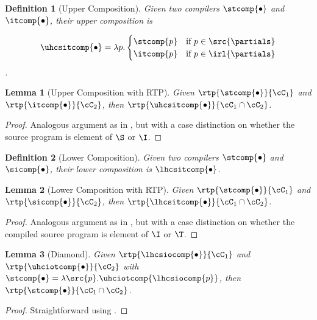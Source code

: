 \documentclass[a4paper,names,dvipsnames]{article}
\newtheorem{definition}{Definition}
\newtheorem{lemma}{Lemma}
\begin{document}
\begin{definition}[Upper Composition]
  Given two compilers $\stcomp{\bullet}$ and $\itcomp{\bullet}$, their upper composition is

  $$\uhcsitcomp{\bullet}=\lambda p.\begin{cases}\stcomp{p} &\text{if }p\in\src{\partials}\\
                                                \itcomp{p} &\text{if }p\in\irl{\partials}\end{cases}$$.
\end{definition}

\begin{lemma}[Upper Composition with RTP]
  Given $\rtp{\stcomp{\bullet}}{\cC_{1}}$ and $\rtp{\itcomp{\bullet}}{\cC_{2}}$, then $\rtp{\uhcsitcomp{\bullet}}{\cC_{1}\cap\cC_{2}}$.
\end{lemma}
\begin{proof}
  Analogous argument as in , but with a case distinction on whether the source program is element of $\S$ or $\I$.
\end{proof}


\begin{definition}[Lower Composition]
  Given two compilers $\stcomp{\bullet}$ and $\sicomp{\bullet}$, their lower composition is $\lhcsitcomp{\bullet}$.
\end{definition}

\begin{lemma}[Lower Composition with RTP]
  Given $\rtp{\stcomp{\bullet}}{\cC_{1}}$ and $\rtp{\sicomp{\bullet}}{\cC_{2}}$, then $\rtp{\lhcsitcomp{\bullet}}{\cC_{1}\cap\cC_{2}}$.
\end{lemma}
\begin{proof}
  Analogous argument as in , but with a case distinction on whether the compiled source program is element of $\I$ or $\T$.
\end{proof}

\begin{lemma}[Diamond]\label{lem:diamond}
  Given $\rtp{\lhcsiocomp{\bullet}}{\cC_{1}}$ and $\rtp{\uhciotcomp{\bullet}}{\cC_{2}}$ with $\stcomp{\bullet} = \lambda\src{p}.\uhciotcomp{\lhcsiocomp{p}}$, then $\rtp{\stcomp{\bullet}}{\cC_{1}\cap\cC_{2}}$.
\end{lemma}
\begin{proof}
  Straightforward using .
\end{proof}
\end{document}
